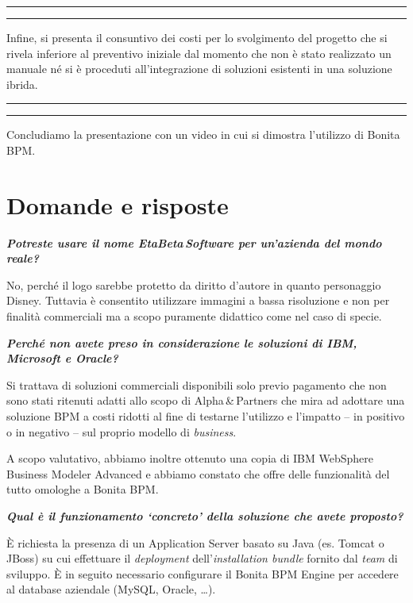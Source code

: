 \documentclass[a4paper,10pt]{article}
\newcommand{\inglese}[1]{\foreignlanguage{english}{\textit{#1}}}
\newcommand{\team}{\textsf{EtaBeta\,Software}\xspace}
\newcommand{\customer}{\textsf{Alpha\,\&\,Partners}\xspace}
\newcommand{\cambioslide}{%
\begin{center}
\Large
\rule[4pt]{0.2\linewidth}{.7pt} \ding{167} \rule[4pt]{0.2\linewidth}{.7pt}
\end{center}
}
\newcommand{\question}[1]{%
\textbf{\textit{#1}}

\smallskip
}
\begin{document}
\cambioslide

Infine, si presenta il consuntivo dei costi per lo svolgimento del progetto che si rivela inferiore al preventivo iniziale dal momento che non è stato realizzato un manuale né si è proceduti all'integrazione di soluzioni esistenti in una soluzione ibrida.

\cambioslide

Concludiamo la presentazione con un video in cui si dimostra l'utilizzo di Bonita BPM.

\clearpage

\section{Domande e risposte}
\question{Potreste usare il nome \team per un'azienda del mondo reale?}
No, perché il logo sarebbe protetto da diritto d'autore in quanto personaggio Disney. Tuttavia è consentito utilizzare immagini a bassa risoluzione e non per finalità commerciali ma a scopo puramente didattico come nel caso di specie.

\medskip

\question{Perché non avete preso in considerazione le soluzioni di IBM, Microsoft e Oracle?}
Si trattava di soluzioni commerciali disponibili solo previo pagamento che non sono stati ritenuti adatti allo scopo di \customer che mira ad adottare una soluzione BPM a costi ridotti al fine di testarne l'utilizzo e l'impatto -- in positivo o in negativo -- sul proprio modello di \inglese{business}.

A scopo valutativo, abbiamo inoltre ottenuto una copia di IBM WebSphere Business Modeler Advanced e abbiamo constato che offre delle funzionalità del tutto omologhe a Bonita BPM.

\medskip

\question{Qual è il funzionamento `concreto' della soluzione che avete proposto?}
È richiesta la presenza di un Application Server basato su Java (es. Tomcat o JBoss) su cui effettuare il \inglese{deployment} dell'\inglese{installation bundle} fornito dal \inglese{team} di sviluppo. È in seguito necessario configurare il Bonita BPM Engine per accedere al database aziendale (MySQL, Oracle, \ldots).
\end{document}
